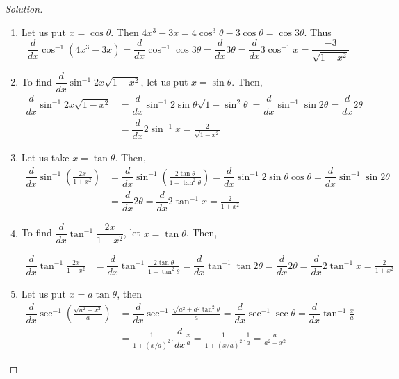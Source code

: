 \documentclass[../../main.tex]{subfiles}
\theoremstyle{definition}
\newenvironment{solution}
    {\begin{proof}[Solution]}
    {\end{proof}}
\begin{document}
\begin{solution}
\begin{enumerate}[label=(\roman*)]
\item Let us put $x=\cos \theta $. Then 
$4x^3-3x=4\cos^3\theta -3 \cos\theta = \cos 3\theta $. Thus
\[
\dfrac{d}{dx} \cos^{-1} (4x^3-3x) = \dfrac{d}{dx} \cos^{-1} \cos 3\theta = \dfrac{d}{dx}3\theta = \dfrac{d}{dx}3\cos^{-1}x = \frac{-3}{\sqrt{1-x^2}}
\]

\item To find $\dfrac{d}{dx} \sin^{-1} 2x\sqrt{1-x^2}$, let us put $x=\sin \theta$. Then,
\begin{align*}
\dfrac{d}{dx} \sin^{-1} 2x\sqrt{1-x^2} &= \dfrac{d}{dx}\sin^{-1}2\sin \theta \sqrt{1-\sin^2 \theta} = \dfrac{d}{dx}\sin^{-1}\sin 2\theta = \dfrac{d}{dx}2\theta \\
&= \dfrac{d}{dx}2 \sin^{-1}x = \frac{2}{\sqrt{1-x^2}}
\end{align*}

\item Let us take $x=\tan\theta$. Then,
\begin{align*}
\dfrac{d}{dx} \sin^{-1} \left(\frac{2x}{1+x^2}\right) &= \dfrac{d}{dx} \sin^{-1} \left(\frac{2\tan\theta}{1+\tan^2\theta}\right) = \dfrac{d}{dx} \sin^{-1} 2\sin\theta \cos\theta = \dfrac{d}{dx} \sin^{-1} \sin2\theta \\ 
&= \dfrac{d}{dx}2\theta = \dfrac{d}{dx}2\tan^{-1}x = \frac{2}{1+x^2}
\end{align*}

\item To find  $\dfrac{d}{dx} \tan^{-1} \dfrac{2x}{1-x^2}$, let $x=\tan \theta $. Then,

\begin{align*}
\dfrac{d}{dx} \tan^{-1} \frac{2x}{1-x^2} &= \dfrac{d}{dx} \tan^{-1} \frac{2\tan \theta}{1-\tan^2\theta} = \dfrac{d}{dx}\tan^{-1}\tan 2\theta = \dfrac{d}{dx}2\theta = \dfrac{d}{dx}2\tan^{-1}x = \frac{2}{1+x^2}
\end{align*}


\item Let us put $x=a\tan\theta$, then
\begin{align*}
\dfrac{d}{dx} \sec^{-1} \left(\frac{\sqrt{a^2+x^2}}{a}\right) &= \dfrac{d}{dx} \sec^{-1} \frac{\sqrt{a^2+a^2\tan^2\theta}}{a} = \dfrac{d}{dx}\sec^{-1} \sec\theta = \dfrac{d}{dx}\tan^{-1}\frac{x}{a} \\
&= \frac{1}{1+(x/a)^2}.\dfrac{d}{dx}\frac{x}{a} = \frac{1}{1+(x/a)^2}.\frac{1}{a} = \frac{a}{a^2+x^2}
\end{align*}


\end{enumerate}
\end{solution}
\end{document}
